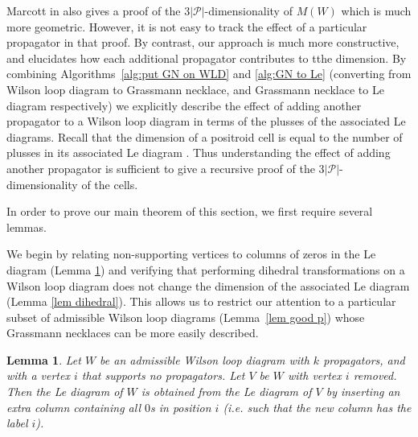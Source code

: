 \documentclass[11pt]{article}
\newcommand{\sanote}{\todo[color=violet!30]}
\newcommand{\cP}{\mathcal{P}}
\newtheorem{lem}[thm]{Lemma}
\theoremstyle{remark}
\theoremstyle{definition}
\begin{document}
Marcott in \cite[Theorem 8.4]{WLDdim} also gives a proof of the $3|\cP|$-dimensionality of $M(W)$ which is much more geometric. However, it is not easy to track the effect of a particular propagator in that proof. By contrast, our approach is much more constructive, and elucidates how each additional propagator contributes to tthe dimension. \sanote{fiddled with this transition} By combining Algorithms~\ref{alg:put GN on WLD} and \ref{alg:GN to Le} (converting from Wilson loop diagram to Grassmann necklace, and Grassmann necklace to Le diagram respectively) we explicitly describe the effect of adding another propagator to a Wilson loop diagram in terms of the plusses of the associated Le diagrams. Recall that the dimension of a positroid cell is equal to the number of plusses in its associated Le diagram \cite[Theorem 6.5]{Postnikov}.  Thus understanding the effect of adding another propagator is sufficient to give a recursive proof of the $3|\cP|$-dimensionality of the cells.




In order to prove our main theorem of this section, we first require several lemmas. 

We begin by relating non-supporting vertices to columns of zeros in the Le diagram (Lemma \ref{lem uncovered}) and verifying that performing dihedral transformations on a Wilson loop diagram does not change the dimension of the associated Le diagram (Lemma \ref{lem dihedral}). This allows us to restrict our attention to a particular subset of admissible Wilson loop diagrams (Lemma~\ref{lem good p}) whose Grassmann necklaces can be more easily described. 

\vspace{0.5em} %
\begin{lem}\label{lem uncovered}
Let $W$ be an admissible Wilson loop diagram with $k$ propagators, and with a vertex $i$ that supports no propagators.  Let $V$ be $W$ with vertex $i$ removed.  Then the Le diagram of $W$ is obtained from the Le diagram of $V$ by inserting an extra column containing all $0$s in position $i$ (i.e. such that the new column has the label $i$).
\end{lem} 
\end{document}
